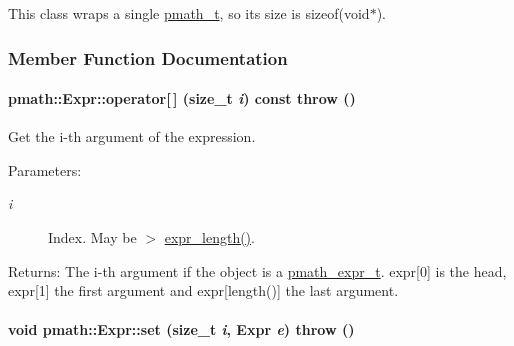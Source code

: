This class wraps a single \hyperlink{classpmath__t}{pmath\_\-t}, so its size is sizeof(void$\ast$). 

\subsubsection{Member Function Documentation}
\hypertarget{classpmath_1_1_expr_b8784170db7ff959775d13071a8f724e}{
\paragraph[{operator[]}]{ pmath::Expr::operator\mbox{[}$\,$\mbox{]} (size\_\-t {\em i}) const  throw ()}\hfill}
\label{classpmath_1_1_expr_b8784170db7ff959775d13071a8f724e}


Get the i-th argument of the expression. 

\begin{Desc}
\item[Parameters:]
\begin{description}
\item[{\em i}]Index. May be $>$ \hyperlink{classpmath_1_1_expr_1c8347cf339bc5bf4c593542c7ba6772}{expr\_\-length()}. \end{description}
\end{Desc}
\begin{Desc}
\item[Returns:]The i-th argument if the object is a \hyperlink{classpmath__expr__t}{pmath\_\-expr\_\-t}. expr\mbox{[}0\mbox{]} is the head, expr\mbox{[}1\mbox{]} the first argument and expr\mbox{[}length()\mbox{]} the last argument. \end{Desc}
\hypertarget{classpmath_1_1_expr_4c9da925b018a1752a4cf1b21b7b634d}{
\paragraph[{set}]{\setlength{\rightskip}{0pt plus 5cm}void pmath::Expr::set (size\_\-t {\em i}, \/  {\bf Expr} {\em e})  throw ()}\hfill}
\label{classpmath_1_1_expr_4c9da925b018a1752a4cf1b21b7b634d}



